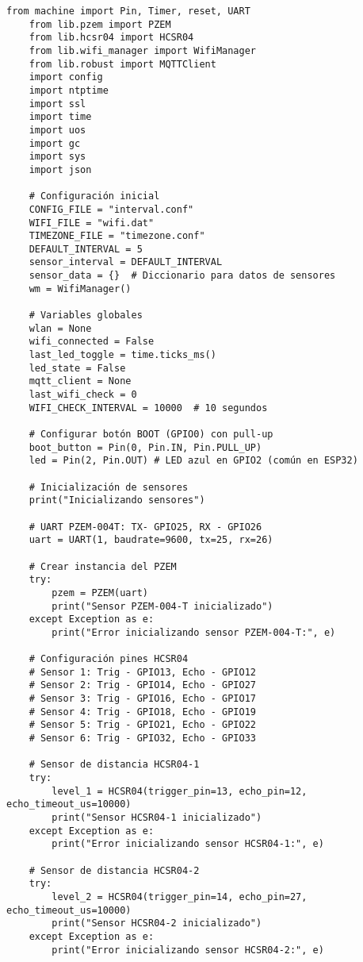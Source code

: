 \begin{lstlisting}[label=cod:firmware,caption=Firmware nodo sensor de consumos. , language=PythonUTF8]
    from machine import Pin, Timer, reset, UART
    from lib.pzem import PZEM
    from lib.hcsr04 import HCSR04
    from lib.wifi_manager import WifiManager
    from lib.robust import MQTTClient
    import config
    import ntptime
    import ssl
    import time
    import uos
    import gc
    import sys
    import json
    
    # Configuración inicial
    CONFIG_FILE = "interval.conf"
    WIFI_FILE = "wifi.dat"
    TIMEZONE_FILE = "timezone.conf"
    DEFAULT_INTERVAL = 5
    sensor_interval = DEFAULT_INTERVAL
    sensor_data = {}  # Diccionario para datos de sensores
    wm = WifiManager()
    
    # Variables globales
    wlan = None
    wifi_connected = False
    last_led_toggle = time.ticks_ms()
    led_state = False
    mqtt_client = None
    last_wifi_check = 0
    WIFI_CHECK_INTERVAL = 10000  # 10 segundos
    
    # Configurar botón BOOT (GPIO0) con pull-up
    boot_button = Pin(0, Pin.IN, Pin.PULL_UP)
    led = Pin(2, Pin.OUT) # LED azul en GPIO2 (común en ESP32)
    
    # Inicialización de sensores
    print("Inicializando sensores")
    
    # UART PZEM-004T: TX- GPIO25, RX - GPIO26 
    uart = UART(1, baudrate=9600, tx=25, rx=26)
    
    # Crear instancia del PZEM
    try:
        pzem = PZEM(uart)
        print("Sensor PZEM-004-T inicializado")
    except Exception as e:
        print("Error inicializando sensor PZEM-004-T:", e)
    
    # Configuración pines HCSR04
    # Sensor 1: Trig - GPIO13, Echo - GPIO12
    # Sensor 2: Trig - GPIO14, Echo - GPIO27
    # Sensor 3: Trig - GPIO16, Echo - GPIO17
    # Sensor 4: Trig - GPIO18, Echo - GPIO19
    # Sensor 5: Trig - GPIO21, Echo - GPIO22
    # Sensor 6: Trig - GPIO32, Echo - GPIO33
    
    # Sensor de distancia HCSR04-1
    try:
        level_1 = HCSR04(trigger_pin=13, echo_pin=12, echo_timeout_us=10000)
        print("Sensor HCSR04-1 inicializado")
    except Exception as e:
        print("Error inicializando sensor HCSR04-1:", e)
    
    # Sensor de distancia HCSR04-2
    try:
        level_2 = HCSR04(trigger_pin=14, echo_pin=27, echo_timeout_us=10000)
        print("Sensor HCSR04-2 inicializado")
    except Exception as e:
        print("Error inicializando sensor HCSR04-2:", e)
        

\end{lstlisting}

